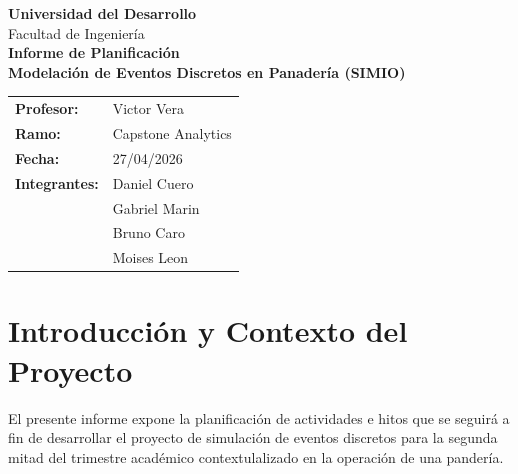 \documentclass[11pt,letterpaper]{article}
\begin{document}
\begin{titlepage}
    \centering
    \vspace*{1cm}
    
    {\Huge \textbf{\textcolor{uddblue}{Universidad del Desarrollo}}}\\[1cm]
    {\LARGE Facultad de Ingeniería}\\[4cm]
    
    {\huge \textbf{Informe de Planificación}}\\[0.5cm]
    {\Large \textbf{Modelación de Eventos Discretos en Panadería (SIMIO)}}\\[6cm]

    \vfill
    
    \begin{flushleft}
        \Medium
        \begin{tabular}{ll}
            \textbf{Profesor:} & Victor Vera\\[0.1cm]
            \textbf{Ramo:} & Capstone Analytics\\[0.1cm]
            \textbf{Fecha:} & 27/04/2026 \\ [0.1cm]
            \textbf{Integrantes:}
            & Daniel Cuero\\
            & Gabriel Marin\\
            & Bruno Caro\\
            & Moises Leon\\[0.1cm]

        \end{tabular}

    \end{flushleft}
    
    \vfill

    

\end{titlepage}

\newpage
\tableofcontents
\newpage

\section{Introducción y Contexto del Proyecto}
El presente informe expone la planificación de actividades e hitos que se seguirá a fin de desarrollar el proyecto de simulación de eventos discretos para la segunda mitad del trimestre académico contextulalizado en la operación de una pandería. 
\end{document}
